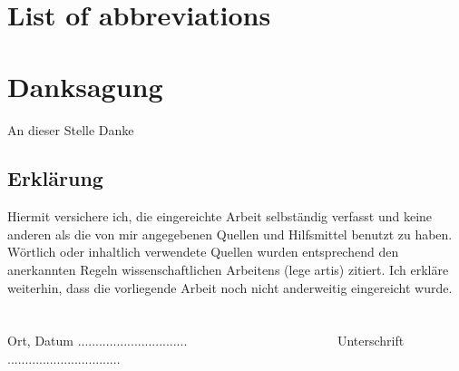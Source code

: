 \documentclass[a4paper,12pt,bibtotocnumbered, twosite]{scrreprt}
\begin{document}
\newpage

\tableofcontents
\chapter*{List of abbreviations}
\begin{acronym}[DARAM]

  
\end{acronym}
\cleardoublepage{}





  


\newpage  

\newpage

\newpage

\newpage

\listoffigures
\listoftables







\chapter*{Danksagung}

An dieser Stelle Danke 
\newpage
\section*{Erklärung}
Hiermit versichere ich, die eingereichte Arbeit selbständig verfasst und
keine anderen als die von mir angegebenen Quellen und Hilfsmittel benutzt zu
haben. Wörtlich oder inhaltlich verwendete Quellen wurden entsprechend den
anerkannten Regeln wissenschaftlichen Arbeitens (lege artis) zitiert. Ich erkläre
weiterhin, dass die vorliegende Arbeit noch nicht anderweitig
eingereicht wurde. 
\\
\\
\\
Ort, Datum ............................... \ \ \ \ \ \ \ \ \ \ \ \ \ \ \ \ \ \ \ \ \ \ \ 
Unterschrift ................................
 
\end{document}
